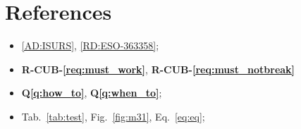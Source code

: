 \documentclass[12pt,a4paper]{report}
\newcommand{\citereq}[1]{\textbf{R-CUB-\ref{#1}}}
\newcommand{\citequestion}[1]{\textbf{Q\ref{#1}}}
\begin{document}
\section{References}
\begin{itemize}
\item \ref{AD:ISURS}, \ref{RD:ESO-363358};
\item \citereq{req:must_work}, \citereq{req:must_notbreak}
\item \citequestion{q:how_to}, \citequestion{q:when_to};
\item Tab.~\ref{tab:test}, Fig.~\ref{fig:m31}, Eq.~\ref{eq:eq};
\end{itemize}


\newpage

\listofreq
\listofquestion
\end{document}

